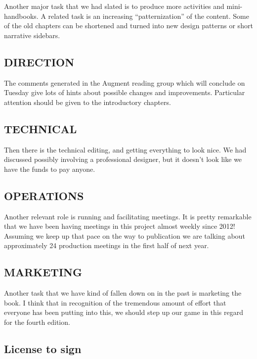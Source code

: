 Another major task that we had slated is to produce more activities and
mini-handbooks. A related task is an increasing ``patternization'' of
the content. Some of the old chapters can be shortened and turned into
new design patterns or short narrative sidebars.

\hypertarget{direction}{%
\subsection{DIRECTION}\label{direction}}

The comments generated in the Augment reading group which will conclude
on Tuesday give lots of hints about possible changes and improvements.
Particular attention should be given to the introductory chapters.

\hypertarget{technical}{%
\subsection{TECHNICAL}\label{technical}}

Then there is the technical editing, and getting everything to look
nice. We had discussed possibly involving a professional designer, but
it doesn't look like we have the funds to pay anyone.

\hypertarget{operations}{%
\subsection{OPERATIONS}\label{operations}}

Another relevant role is running and facilitating meetings. It is pretty
remarkable that we have been having meetings in this project almost
weekly since 2012! Assuming we keep up that pace on the way to
publication we are talking about approximately 24 production meetings in
the first half of next year.

\hypertarget{marketing}{%
\subsection{MARKETING}\label{marketing}}

Another task that we have kind of fallen down on in the past is
marketing the book. I think that in recognition of the tremendous amount
of effort that everyone has been putting into this, we should step up
our game in this regard for the fourth edition.

\hypertarget{license-to-sign}{%
\subsection{License to sign}\label{license-to-sign}}

